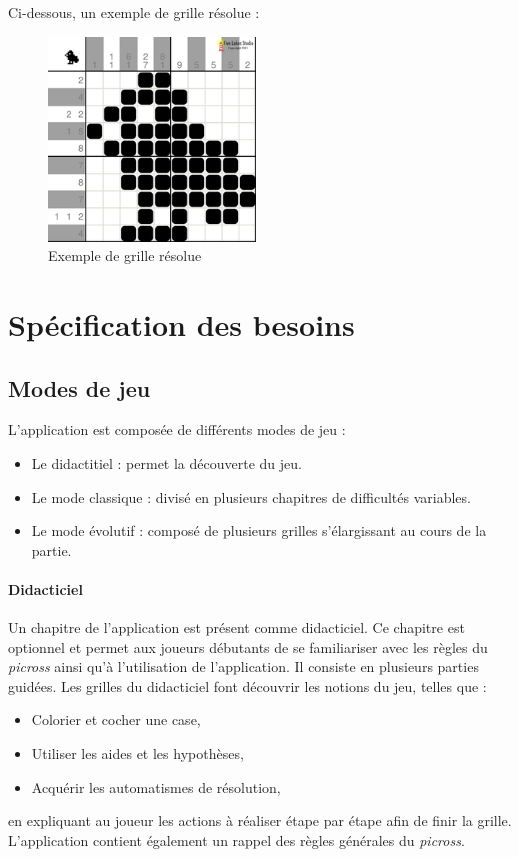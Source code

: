 \documentclass[a4paper, 12pt]{report}
\begin{document}
		Ci-dessous, un exemple de grille résolue :
		
	\begin{figure}[H]
		\centering
		\caption{Exemple de grille résolue}
		\includegraphics[width=5.5cm]{picross.png}
	\end{figure}
		
\chapter{Spécification des besoins}
\vspace*{0.5cm}

		\section{Modes de jeu}
		
			L'application est composée de différents modes de jeu :
			\begin{itemize}
            	\item Le didactitiel : permet la découverte du jeu.
            	\item Le mode classique : divisé en plusieurs chapitres de difficultés variables.
            	\item Le mode évolutif : composé de plusieurs grilles s'élargissant au cours de la partie.
        	\end{itemize}

	    \subsubsection{Didacticiel}
	    
		    Un chapitre de l'application est présent comme didacticiel. Ce chapitre est optionnel et permet aux joueurs   débutants de se familiariser avec les règles du \textit{picross} ainsi qu'à l'utilisation de l'application. Il consiste en plusieurs parties guidées. Les grilles du didacticiel font découvrir les notions du jeu, telles que :
		    \begin{itemize}
            	\item Colorier et cocher une case,
            	\item Utiliser les aides et les hypothèses,
            	\item Acquérir les automatismes de résolution,
        	\end{itemize}
		    en expliquant au joueur les actions à réaliser étape par étape afin de finir la grille. L'application contient également un rappel des règles générales du \textit{picross}.
		    
\end{document}

